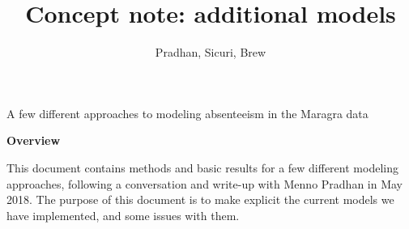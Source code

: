 \documentclass[]{article}
\title{Concept note: additional models}
\subtitle{Pradhan, Sicuri, Brew}
\author{}
\date{}
\begin{document}
\maketitle

\begin{center}
\begin{large}

A few different approaches to modeling absenteeism in the Maragra data

\end{large}
\end{center}

\vspace{5mm}

\begin{center}
\textbf{Overview}  
\end{center}

\vspace{5mm}

\begin{center}
\begin{changemargin}{3cm}{3cm} 

This document contains methods and basic results for a few different modeling approaches, following a conversation and write-up with Menno Pradhan in May 2018. The purpose of this document is to make explicit the current models we have implemented, and some issues with them.

\end{changemargin}
\end{center}

\vspace{20mm}

\noindent{}
\end{document}

